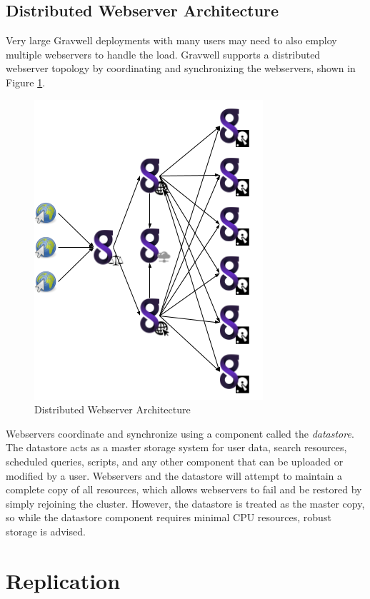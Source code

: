 {\subsection{Distributed Webserver Architecture}

Very large Gravwell deployments with many users may need to also employ
multiple webservers to handle the load. Gravwell supports a distributed
webserver topology by coordinating and synchronizing the webservers, 
shown in Figure \ref{fig:distributed}.

\begin{figure}
	\includegraphics[width=0.6\linewidth]{images/distributed.png}
	\caption{Distributed Webserver Architecture}
	\label{fig:distributed}
\end{figure}

Webservers coordinate and synchronize using a component called the
\emph{datastore}. The datastore acts as a master storage system for user data,
search resources, scheduled queries, scripts, and any other component
that can be uploaded or modified by a user. Webservers and the
datastore will attempt to maintain a complete copy of all resources,
which allows webservers to fail and be restored by simply rejoining the
cluster. However, the datastore is treated as the master copy, so while
the datastore component requires minimal CPU resources, robust storage is advised.

\clearpage
\section{Replication}

}

